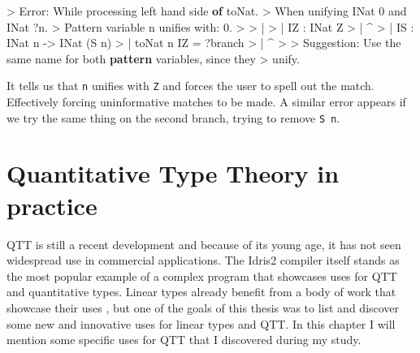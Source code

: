 \documentclass[
]{article}
\newenvironment{Shaded}{}{}
\newcommand{\DataTypeTok}[1]{\textcolor[rgb]{0.56,0.13,0.00}{#1}}
\newcommand{\DecValTok}[1]{\textcolor[rgb]{0.25,0.63,0.44}{#1}}
\newcommand{\FunctionTok}[1]{\textcolor[rgb]{0.02,0.16,0.49}{#1}}
\newcommand{\KeywordTok}[1]{\textcolor[rgb]{0.00,0.44,0.13}{\textbf{#1}}}
\newcommand{\NormalTok}[1]{#1}
\newcommand{\OperatorTok}[1]{\textcolor[rgb]{0.40,0.40,0.40}{#1}}
\newcommand{\OtherTok}[1]{\textcolor[rgb]{0.00,0.44,0.13}{#1}}
\begin{document}
\begin{Shaded}
\begin{Highlighting}[]
\OperatorTok{\textgreater{}} \DataTypeTok{Error}\OperatorTok{:} \DataTypeTok{While}\NormalTok{ processing left hand side }\KeywordTok{of}\NormalTok{ toNat}\OperatorTok{.} 
\OperatorTok{\textgreater{}}   \DataTypeTok{When}\NormalTok{ unifying }\DataTypeTok{INat} \DecValTok{0} \FunctionTok{and} \DataTypeTok{INat} \OperatorTok{?}\NormalTok{n}\OperatorTok{.}
\OperatorTok{\textgreater{}} \DataTypeTok{Pattern}\NormalTok{ variable n unifies with}\OperatorTok{:} \DecValTok{0}\OperatorTok{.}
\OperatorTok{\textgreater{}} 
\OperatorTok{\textgreater{}}     \OperatorTok{|}
\OperatorTok{\textgreater{}}     \OperatorTok{|}   \DataTypeTok{IZ} \OperatorTok{:} \DataTypeTok{INat} \DataTypeTok{Z}
\OperatorTok{\textgreater{}}     \OperatorTok{|}             \OperatorTok{\^{}}
\OperatorTok{\textgreater{}}     \OperatorTok{|}   \DataTypeTok{IS} \OperatorTok{:} \DataTypeTok{INat}\NormalTok{ n }\OtherTok{{-}\textgreater{}} \DataTypeTok{INat}\NormalTok{ (}\DataTypeTok{S}\NormalTok{ n)}
\OperatorTok{\textgreater{}}     \OperatorTok{|}\NormalTok{  toNat n }\DataTypeTok{IZ} \OtherTok{=} \OperatorTok{?}\NormalTok{branch}
\OperatorTok{\textgreater{}}     \OperatorTok{|}        \OperatorTok{\^{}}
\OperatorTok{\textgreater{}} 
\OperatorTok{\textgreater{}} \DataTypeTok{Suggestion}\OperatorTok{:} \DataTypeTok{Use}\NormalTok{ the same name for both }\KeywordTok{pattern}\NormalTok{ variables, since they }
\OperatorTok{\textgreater{}}\NormalTok{   unify}\OperatorTok{.}
\end{Highlighting}
\end{Shaded}

It tells us that \texttt{n} unifies with \texttt{Z} and forces the user
to spell out the match. Effectively forcing uninformative matches to be
made. A similar error appears if we try the same thing on the second
branch, trying to remove \texttt{S\ n}.

\newpage

\hypertarget{quantitative-type-theory-in-practice}{%
\section{Quantitative Type Theory in
practice}\label{quantitative-type-theory-in-practice}}

QTT is still a recent development and because of its young age, it has
not seen widespread use in commercial applications. The Idris2 compiler
itself stands as the most popular example of a complex program that
showcases uses for QTT and quantitative types. Linear types already
benefit from a body of work that showcase their uses
\cite{linear_diff}\cite{linear_types_update}\cite{linear_types_session}\cite{linear_types_subst}\cite{actor_channels}\cite{linear_race}\cite{linear_use}\cite{once_upon_a_type}\cite{deforestation},
but one of the goals of this thesis was to list and discover some new
and innovative uses for linear types and QTT. In this chapter I will
mention some specific uses for QTT that I discovered during my study.
\end{document}
